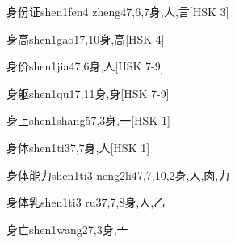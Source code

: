 \begin{EntryWithPhonetic}{身份证}{shen1fen4 zheng4}{7,6,7}{⾝,⼈,⾔}[HSK 3]
\end{EntryWithPhonetic}

\begin{EntryWithPhonetic}{身高}{shen1gao1}{7,10}{⾝,⾼}[HSK 4]
\end{EntryWithPhonetic}

\begin{EntryWithPhonetic}{身价}{shen1jia4}{7,6}{⾝,⼈}[HSK 7-9]
\end{EntryWithPhonetic}

\begin{EntryWithPhonetic}{身躯}{shen1qu1}{7,11}{⾝,⾝}[HSK 7-9]
\end{EntryWithPhonetic}

\begin{EntryWithPhonetic}{身上}{shen1shang5}{7,3}{⾝,⼀}[HSK 1]
\end{EntryWithPhonetic}

\begin{EntryWithPhonetic}{身体}{shen1ti3}{7,7}{⾝,⼈}[HSK 1]
\end{EntryWithPhonetic}

\begin{EntryWithPhonetic}{身体能力}{shen1ti3 neng2li4}{7,7,10,2}{⾝,⼈,⾁,⼒}
\end{EntryWithPhonetic}

\begin{EntryWithPhonetic}{身体乳}{shen1ti3 ru3}{7,7,8}{⾝,⼈,⼄}
\end{EntryWithPhonetic}

\begin{EntryWithPhonetic}{身亡}{shen1wang2}{7,3}{⾝,⼇}
\end{EntryWithPhonetic}

